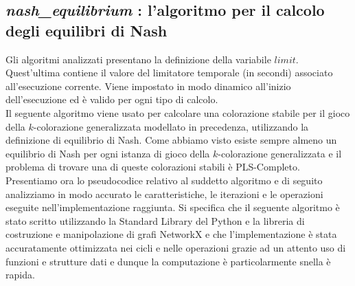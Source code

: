 \subsection{\textit{nash\_equilibrium} : l'algoritmo per il calcolo degli equilibri di Nash}
\justify
Gli algoritmi analizzati presentano la definizione della variabile $limit$. Quest'ultima contiene il valore del limitatore temporale (in secondi) associato all'esecuzione corrente. Viene impostato in modo dinamico all'inizio dell'esecuzione ed è valido per ogni tipo di calcolo.\\
Il seguente algoritmo viene usato per calcolare una colorazione stabile per il gioco della \(k\)-colorazione generalizzata modellato in precedenza, utilizzando la definizione di equilibrio di Nash. Come abbiamo visto esiste sempre almeno un equilibrio di Nash per ogni istanza di gioco della \(k\)-colorazione generalizzata e il problema di trovare una di queste colorazioni stabili è PLS-Completo. Presentiamo ora lo pseudocodice relativo al suddetto algoritmo e di seguito analizziamo in modo accurato le caratteristiche, le iterazioni e le operazioni eseguite nell'implementazione raggiunta. Si specifica che il seguente algoritmo è stato scritto utilizzando la Standard Library del Python e la libreria di costruzione e manipolazione di grafi NetworkX e che l'implementazione è stata accuratamente ottimizzata nei cicli e nelle operazioni grazie ad un attento uso di funzioni e strutture dati e dunque la computazione è particolarmente snella è rapida.

